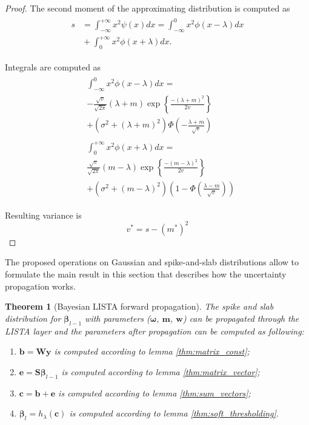 \documentclass[letterpaper]{article}
\newtheorem{theorem}{Theorem}
\begin{document}
\begin{proof}
The second moment of the approximating distribution is computed as
\begin{align}
\begin{split}
s &= \int_{-\infty}^{+\infty}x^2\psi(x)dx = \int_{-\infty}^{0}x^2\phi(x-\lambda)dx \\
&{}+ \int_{0}^{+\infty}x^2\phi(x+\lambda)dx.
\end{split}
\end{align}

Integrals are computed as
\begin{align}
\begin{split}
&\int_{-\infty}^{0}x^2\phi(x-\lambda)dx = \\
&-\frac{\sqrt{v}}{\sqrt{2\pi}} (\lambda+m)\exp\left\{\frac{-(\lambda+m)^2}{2v}\right\}\\
& + (\sigma^2 + (\lambda+m)^2)\Phi\left(-\frac{\lambda+m}{\sqrt{v}}\right)
\end{split}\\
\begin{split}
&\int_{0}^{+\infty}x^2\phi(x+\lambda)dx = \\
&\frac{\sqrt{v}}{\sqrt{2\pi}} (m - \lambda)\exp\left\{\frac{-(m - \lambda)^2}{2v}\right\}\\
& + (\sigma^2 + (m - \lambda)^2)\left(1 - \Phi\left(\frac{\lambda -m}{\sqrt{v}}\right)\right)
\end{split}
\end{align}

Resulting variance is
\begin{equation}
v^* = s- (m^*)^2
\end{equation}

\end{proof}

The proposed operations on Gaussian and spike-and-slab distributions allow to formulate the main result in this section that describes how the uncertainty propagation works.
\begin{theorem}[Bayesian LISTA forward propagation]
\label{thm:prob_layer}
The spike and slab distribution for $\boldsymbol\beta_{l-1}$ with parameters ($\boldsymbol\omega$, $\mathbf{m}$, $\mathbf{w}$) can be propagated through the LISTA layer and the parameters after propagation can be computed as following:
\begin{enumerate}
	\item $\mathbf{b} = \mathbf{W}\mathbf{y}$ is computed according to lemma \ref{thm:matrix_const};
	\item $\mathbf{e} = \mathbf{S}\boldsymbol\beta_{l-1}$ is computed according to lemma \ref{thm:matrix_vector};
	\item $\mathbf{c} = \mathbf{b} + \mathbf{e}$ is computed according to lemma \ref{thm:sum_vectors};
	\item $\boldsymbol\beta_{l} = h_\lambda(\mathbf{c})$ is computed according to lemma \ref{thm:soft_thresholding}.
\end{enumerate}
\end{theorem}
\end{document}
